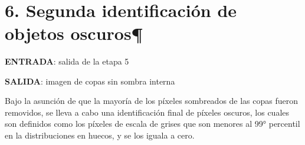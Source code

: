 \documentclass[11pt]{article}
\begin{document}
    \begin{center}
    \end{center}
    { \hspace*{\fill} \\}
    
    \begin{center}
    \end{center}
    { \hspace*{\fill} \\}
    
    \begin{center}
    \end{center}
    { \hspace*{\fill} \\}
    
    \hypertarget{segunda-identificaciuxf3n-de-objetos-oscuros}{%
\section{6. Segunda identificación de objetos
oscuros¶}\label{segunda-identificaciuxf3n-de-objetos-oscuros}}

\textbf{ENTRADA}: salida de la etapa 5

\textbf{SALIDA}: imagen de copas sin sombra interna

Bajo la asunción de que la mayoría de los píxeles sombreados de las
copas fueron removidos, se lleva a cabo una identificación final de
píxeles oscuros, los cuales son definidos como los píxeles de escala de
grises que son menores al 99° percentil en la distribuciones en huecos,
y se los iguala a cero.
\end{document}
